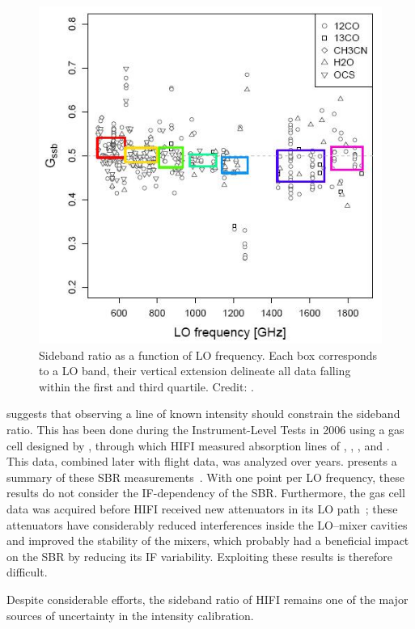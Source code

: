 \begin{figure}[b]
    \centering
    \includegraphics[width=.75\textwidth]{sideband_ratio}
    \caption{
        Sideband ratio as a function of LO frequency.
        Each box corresponds to a LO band, their vertical extension delineate all data falling within the first and third quartile.
        Credit: \textcite{higgins2014effect}.
    }
    \label{fig:sideband_ratio}
\end{figure}

 suggests that observing a line of known intensity should constrain the sideband ratio.
This has been done during the Instrument-Level Tests in 2006 using a gas cell designed by \textcite{teyssier2004multi}, through which HIFI measured absorption lines of , , ,  and .
This data, combined later with flight data, was analyzed over years.
 presents a summary of these SBR measurements~\autocite{higgins2010calibration,higgins2014effect}.
With one point per LO frequency, these results do not consider the IF-dependency of the SBR.
Furthermore, the gas cell data was acquired before HIFI received new attenuators in its LO path~\autocite{jellema2008flight}; these attenuators have considerably reduced interferences inside the LO--mixer cavities and improved the stability of the mixers, which probably had a beneficial impact on the SBR by reducing its IF variability.
Exploiting these results is therefore difficult.

Despite considerable efforts, the sideband ratio of HIFI remains one of the major sources of uncertainty in the intensity calibration.








